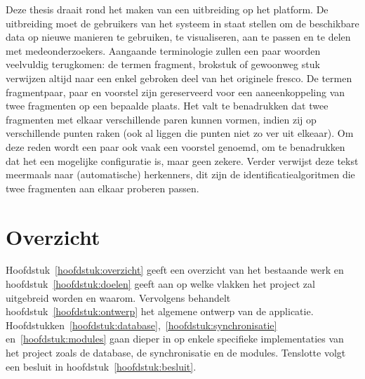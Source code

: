 Deze thesis draait rond het maken van een uitbreiding op het platform. De uitbreiding moet de gebruikers van het systeem in staat stellen om de beschikbare data op nieuwe manieren te gebruiken, te visualiseren, aan te passen en te delen met medeonderzoekers. Aangaande terminologie zullen een paar woorden veelvuldig terugkomen: de termen fragment, brokstuk of gewoonweg stuk verwijzen altijd naar een enkel gebroken deel van het originele fresco. De termen fragmentpaar, paar en voorstel zijn gereserveerd voor een aaneenkoppeling van twee fragmenten op een bepaalde plaats. Het valt te benadrukken dat twee fragmenten met elkaar verschillende paren kunnen vormen, indien zij op verschillende punten raken (ook al liggen die punten niet zo ver uit elkeaar). Om deze reden wordt een paar ook vaak een voorstel genoemd, om te benadrukken dat het een mogelijke configuratie is, maar geen zekere. Verder verwijst deze tekst meermaals naar (automatische) herkenners, dit zijn de identificatiealgoritmen die twee fragmenten aan elkaar proberen passen.\\

\section{Overzicht}
Hoofdstuk~\ref{hoofdstuk:overzicht} geeft een overzicht van het bestaande werk en hoofdstuk~\ref{hoofdstuk:doelen} geeft aan op welke vlakken het project zal uitgebreid worden en waarom. Vervolgens behandelt hoofdstuk~\ref{hoofdstuk:ontwerp} het algemene ontwerp van de applicatie. Hoofdstukken~\ref{hoofdstuk:database},~\ref{hoofdstuk:synchronisatie} en~\ref{hoofdstuk:modules} gaan dieper in op enkele specifieke implementaties van het project zoals de database, de synchronisatie en de modules. Tenslotte volgt een besluit in hoofdstuk~\ref{hoofdstuk:besluit}.
